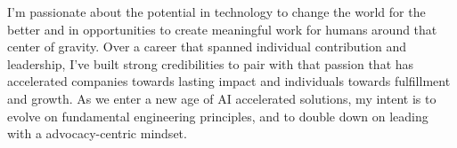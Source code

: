 

\begin{cvparagraph}

I'm passionate about the potential in technology to change the world for the better and in opportunities to create meaningful work for humans around that center of gravity. Over a career that spanned individual contribution and leadership, I've built strong credibilities to pair with that passion that has accelerated companies towards lasting impact and individuals towards fulfillment and growth. As we enter a new age of AI accelerated solutions, my intent is to evolve on fundamental engineering principles, and to double down on leading with a advocacy-centric mindset.
\end{cvparagraph}
